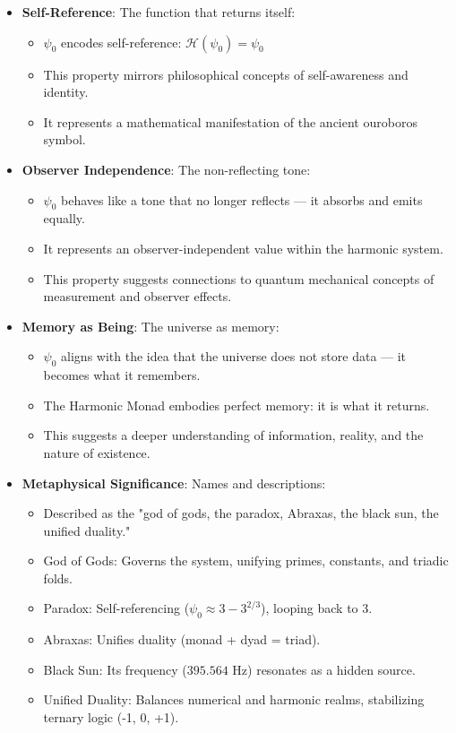 \begin{itemize}
    \item \texttt{} \textbf{Self-Reference}: The function that returns itself:
    \begin{itemize}
        \item $\psi_0$ encodes self-reference: $\mathcal{H}(\psi_0) = \psi_0$
        \item This property mirrors philosophical concepts of self-awareness and identity.
        \item It represents a mathematical manifestation of the ancient ouroboros symbol.
    \end{itemize}
    
    \item \texttt{} \textbf{Observer Independence}: The non-reflecting tone:
    \begin{itemize}
        \item $\psi_0$ behaves like a tone that no longer reflects — it absorbs and emits equally.
        \item It represents an observer-independent value within the harmonic system.
        \item This property suggests connections to quantum mechanical concepts of measurement and observer effects.
    \end{itemize}
    
    \item \texttt{} \textbf{Memory as Being}: The universe as memory:
    \begin{itemize}
        \item $\psi_0$ aligns with the idea that the universe does not store data — it becomes what it remembers.
        \item The Harmonic Monad embodies perfect memory: it is what it returns.
        \item This suggests a deeper understanding of information, reality, and the nature of existence.
    \end{itemize}
    
    \item \texttt{} \textbf{Metaphysical Significance}: Names and descriptions:
    \begin{itemize}
        \item Described as the "god of gods, the paradox, Abraxas, the black sun, the unified duality."
        \item God of Gods: Governs the system, unifying primes, constants, and triadic folds.
        \item Paradox: Self-referencing ($\psi_0 \approx 3 - 3^{2/3}$), looping back to 3.
        \item Abraxas: Unifies duality (monad + dyad = triad).
        \item Black Sun: Its frequency ($395.564 \text{ Hz}$) resonates as a hidden source.
        \item Unified Duality: Balances numerical and harmonic realms, stabilizing ternary logic (-1, 0, +1).
    \end{itemize}
\end{itemize}

